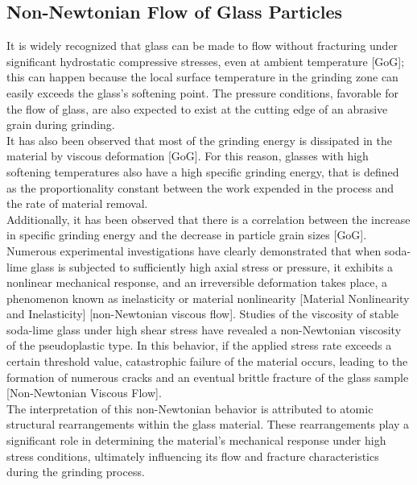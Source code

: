 \subsection{Non-Newtonian Flow of Glass Particles}
It is widely recognized that glass can be made to flow without fracturing under significant hydrostatic compressive stresses, even at ambient temperature [GoG]; this can happen because the local surface temperature in the grinding zone can easily exceeds the glass's softening point. The pressure conditions, favorable for the flow of glass, are also expected to exist at the cutting edge of an abrasive grain during grinding.
\\
It has also been observed that most of the grinding energy is dissipated in the material by viscous deformation [GoG]. For this reason, glasses with high softening temperatures also have a high specific grinding energy, that is defined as the proportionality constant between the work expended in the process and the rate of material removal.
\\
Additionally, it has been observed that there is a correlation between the increase in specific grinding energy and the decrease in particle grain sizes [GoG].
\\
Numerous experimental investigations have clearly demonstrated that when soda-lime glass is subjected to sufficiently high axial stress or pressure, it exhibits a nonlinear mechanical response, and an irreversible deformation takes place, a phenomenon known as inelasticity or material nonlinearity [Material Nonlinearity and Inelasticity] [non-Newtonian viscous flow]. Studies of the viscosity of stable soda-lime glass under high shear stress have revealed a non-Newtonian viscosity of the pseudoplastic type. In this behavior, if the applied stress rate exceeds a certain threshold value, catastrophic failure of the material occurs, leading to the formation of numerous cracks and an eventual brittle fracture of the glass sample [Non-Newtonian Viscous Flow].
\\
The interpretation of this non-Newtonian behavior is attributed to atomic structural rearrangements within the glass material. These rearrangements play a significant role in determining the material's mechanical response under high stress conditions, ultimately influencing its flow and fracture characteristics during the grinding process.
